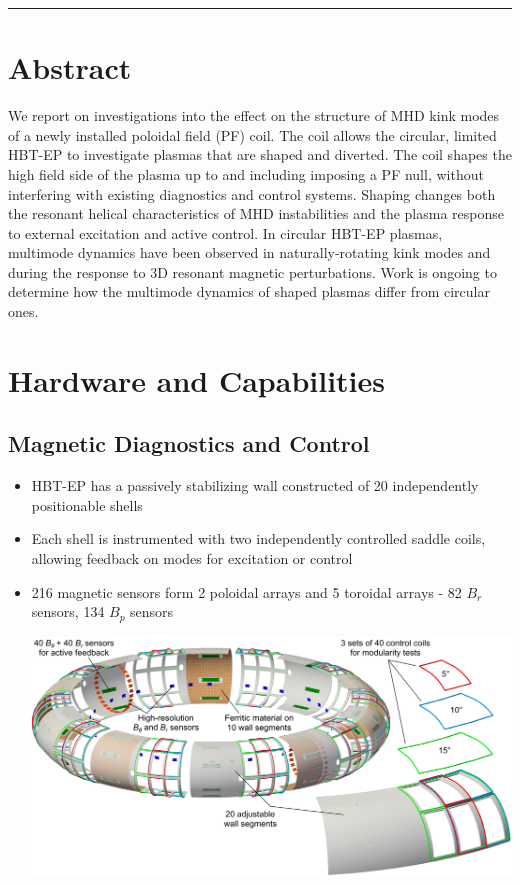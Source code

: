 \documentclass{article}
\begin{document}
\vspace{100mm}
\hrule{}
\vspace{10mm}


\begin{multicols}{5}
\section{Abstract}
We report on investigations into the effect on the structure of MHD kink modes of a newly installed poloidal field (PF) coil.  The coil allows the circular, limited HBT-EP to investigate plasmas that are shaped and diverted.  The coil shapes the high field side of the plasma up to and including imposing a PF null, without interfering with existing diagnostics and control systems. Shaping changes both the resonant helical characteristics of MHD instabilities\cite{Maurer} and the plasma response to external excitation and active control. In circular HBT-EP plasmas, multimode dynamics have been observed in naturally-rotating kink modes and during the response to 3D resonant magnetic perturbations\cite{Levesque, Shiraki}.  Work is ongoing to determine how the multimode dynamics of shaped plasmas differ from circular ones.\\
\section{Hardware and Capabilities}
\subsection{Magnetic Diagnostics and Control}
\begin{itemize}
\item HBT-EP has a passively stabilizing wall constructed of 20 independently positionable shells
\item Each shell is instrumented with two independently controlled saddle coils, allowing feedback on modes for excitation or control
\item 216 magnetic sensors form 2 poloidal arrays and 5 toroidal arrays
\subitem - 82 $B_r$ sensors, 134 $B_p$ sensors
\begin{center}
\includegraphics[width=0.9\columnwidth]{Plasma_with_sensors_FWall_concept_WithCCview}

\end{center}
\end{itemize}
\end{multicols}
\end{document}
